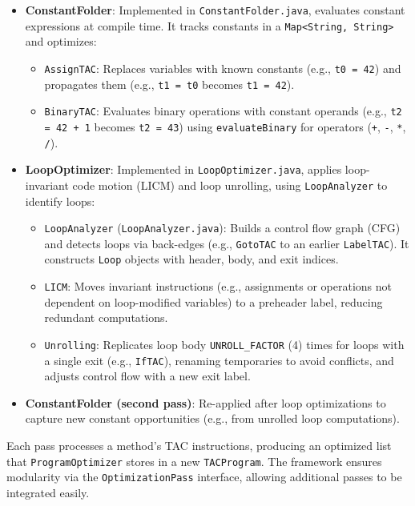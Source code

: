 \documentclass[11pt, titlepage]{article}
\begin{document}
\begin{itemize}[leftmargin=*]
    \item \textbf{ConstantFolder}: Implemented in \texttt{ConstantFolder.java}, evaluates constant expressions at compile time. It tracks constants in a \texttt{Map<String, String>} and optimizes:
        \begin{itemize}
            \item \texttt{AssignTAC}: Replaces variables with known constants (e.g., \texttt{t0 = 42}) and propagates them (e.g., \texttt{t1 = t0} becomes \texttt{t1 = 42}).
            \item \texttt{BinaryTAC}: Evaluates binary operations with constant operands (e.g., \texttt{t2 = 42 + 1} becomes \texttt{t2 = 43}) using \texttt{evaluateBinary} for operators (\texttt{+}, \texttt{-}, \texttt{*}, \texttt{/}).
        \end{itemize}
    \item \textbf{LoopOptimizer}: Implemented in \texttt{LoopOptimizer.java}, applies loop-invariant code motion (LICM) and loop unrolling, using \texttt{LoopAnalyzer} to identify loops:
        \begin{itemize}
            \item \texttt{LoopAnalyzer} (\texttt{LoopAnalyzer.java}): Builds a control flow graph (CFG) and detects loops via back-edges (e.g., \texttt{GotoTAC} to an earlier \texttt{LabelTAC}). It constructs \texttt{Loop} objects with header, body, and exit indices.
            \item \texttt{LICM}: Moves invariant instructions (e.g., assignments or operations not dependent on loop-modified variables) to a preheader label, reducing redundant computations.
            \item \texttt{Unrolling}: Replicates loop body \texttt{UNROLL\_FACTOR} (4) times for loops with a single exit (e.g., \texttt{IfTAC}), renaming temporaries to avoid conflicts, and adjusts control flow with a new exit label.
        \end{itemize}
    \item \textbf{ConstantFolder (second pass)}: Re-applied after loop optimizations to capture new constant opportunities (e.g., from unrolled loop computations).
\end{itemize}

Each pass processes a method's TAC instructions, producing an optimized list that \texttt{ProgramOptimizer} stores in a new \texttt{TACProgram}. The framework ensures modularity via the \texttt{OptimizationPass} interface, allowing additional passes to be integrated easily.
\end{document}
